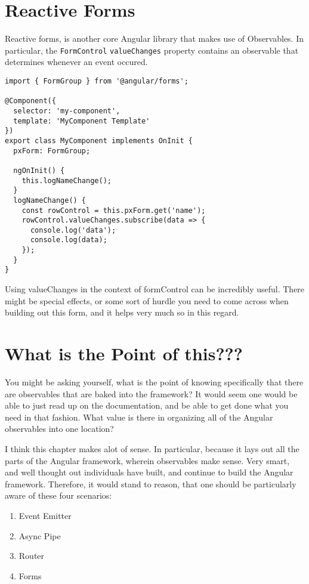 \section{ Reactive Forms }
Reactive forms, is another core Angular library that makes use of Observables. 
In particular, the \lstinline{FormControl} \lstinline{valueChanges} property 
contains an observable that determines whenever an event occured. 
\begin{lstlisting}
import { FormGroup } from '@angular/forms';

@Component({
  selector: 'my-component',
  template: 'MyComponent Template'
})
export class MyComponent implements OnInit {
  pxForm: FormGroup;

  ngOnInit() {
    this.logNameChange();
  }
  logNameChange() {
    const rowControl = this.pxForm.get('name');
    rowControl.valueChanges.subscribe(data => {
      console.log('data');
      console.log(data);
    });
  }
}  
\end{lstlisting}

Using valueChanges in the context of formControl can be incredibly useful. 
There might be special effects, or some sort of hurdle you need to come 
across when building out this form, and it helps very much so in this 
regard. 


\section{What is the Point of this??? }
You might be asking yourself, what is the point of knowing specifically that 
there are observables that are baked into the framework? It would seem one 
would be able to just read up on the documentation, and be able to get done 
what you need in that fashion. What value is there in organizing all of the 
Angular observables into one location? 

I think this chapter makes alot of sense. In particular, because it lays out
all the parts of the Angular framework, wherein observables make sense. Very 
smart, and well thought out individuals have built, and continue to build the 
Angular framework. Therefore, it would stand to reason, that one should be 
particularly aware of these four scenarios: 
\begin{enumerate}
  \item Event Emitter
  \item Async Pipe
  \item Router
  \item Forms
\end{enumerate}

